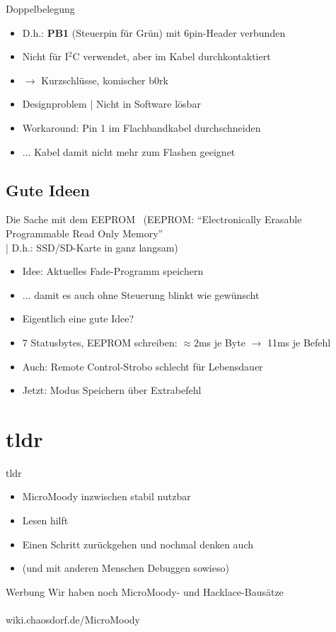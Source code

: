 \documentclass[compress]{beamer}
\begin{document}
\begin{frame}{Doppelbelegung}
\begin{itemize}
\item<1-> D.h.: \textbf{PB1} (Steuerpin für Grün) mit 6pin-Header verbunden
\item<1-> Nicht für I$^2$C verwendet, aber im Kabel durchkontaktiert
\item<2-> $\to$ Kurzschlüsse, komischer b0rk
\end{itemize}
\begin{itemize}
\item<4-> Designproblem | Nicht in Software lösbar
\item<5-> Workaround: Pin 1 im Flachbandkabel durchschneiden
\item<6-> ... Kabel damit nicht mehr zum Flashen geeignet
\end{itemize}
\end{frame}

\subsection{Gute Ideen}
\begin{frame}{Die Sache mit dem EEPROM}
\ 
{\small (EEPROM: "`Electronically Erasable Programmable Read Only Memory"'\\
| D.h.: SSD/SD-Karte in ganz langsam)}
\begin{itemize}
\item<2-> Idee: Aktuelles Fade-Programm speichern
\item<2-> ... damit es auch ohne Steuerung blinkt wie gewünscht
\item<3-> Eigentlich eine gute Idee?
\end{itemize}
\begin{itemize}
\item<5-> 7 Statusbytes, EEPROM schreiben: $\approx 2$ms je Byte $\to$ 11ms je Befehl
\item<6-> Auch: Remote Control-Strobo schlecht für Lebensdauer
\item<7-> Jetzt: Modus Speichern über Extrabefehl
\end{itemize}
\end{frame}

\section{tldr}
\begin{frame}{tldr}
\begin{itemize}
\item MicroMoody inzwischen stabil nutzbar
\item<2-> Lesen hilft
\item<2-> Einen Schritt zurückgehen und nochmal denken auch
\item<3-> (und mit anderen Menschen Debuggen sowieso)
\end{itemize}
\end{frame}

\begin{frame}{Werbung}
Wir haben noch MicroMoody- und Hacklace-Bausätze\\
\ \\
wiki.chaosdorf.de/MicroMoody
\end{frame}
\end{document}
